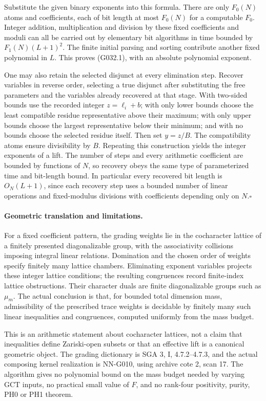 Substitute the given binary exponents into this formula.
There are only $F_0(N)$ atoms and coefficients, each of
bit length at most $F_0(N)$ for a computable $F_0$.
Integer addition, multiplication and division by these
fixed coefficients and moduli can all be carried out by
elementary bit algorithms in time bounded by
$F_1(N)(L+1)^2$. The finite initial parsing and sorting
contribute another fixed polynomial in $L$.
This proves (G032.1), with an absolute polynomial exponent.

One may also retain the selected disjunct at every elimination
step. Recover variables in reverse order, selecting a true
disjunct after substituting the free parameters and the variables
already recovered at that stage. With two-sided
bounds use the recorded integer $z=\ell_i+b$; with only
lower bounds choose the least compatible residue representative
above their maximum; with only upper bounds choose the
largest representative below their minimum; and with no
bounds choose the selected residue itself. Then set $y=z/B$.
The compatibility atoms ensure divisibility by $B$.
Repeating this construction yields the integer exponents
of a lift. The number of steps and every arithmetic
coefficient are bounded by functions of $N$, so recovery
obeys the same type of parameterized time and bit-length
bound. In particular every recovered bit length is
$O_N(L+1)$, since each recovery step uses a bounded number
of linear operations and fixed-modulus divisions with
coefficients depending only on $N$.\hfill$\square$

\paragraph{Geometric translation and limitations.}
For a fixed coefficient pattern, the grading weights lie
in the cocharacter lattice of a finitely presented
diagonalizable group, with the associativity collisions
imposing integral linear relations. Domination and the
chosen order of weights specify finitely many lattice
chambers. Eliminating exponent variables projects these
integer lattice conditions; the resulting congruences
record finite-index lattice obstructions. Their character
duals are finite diagonalizable groups such as $\mu_m$.
The actual conclusion is that, for bounded total dimension
mass, admissibility of the prescribed trace weights is
decidable by finitely many such linear inequalities and
congruences, computed uniformly from the mass budget.

This is an arithmetic statement about cocharacter lattices,
not a claim that inequalities define Zariski-open subsets
or that an effective lift is a canonical geometric object.
The grading dictionary is SGA 3, I, 4.7.2--4.7.3, and
the actual composing kernel realization is NN-G010,
using archive cote 2, scan 17. The algorithm gives no
polynomial bound on the mass budget needed by varying
GCT inputs, no practical small value of $F$, and no
rank-four positivity, purity, PH0 or PH1 theorem.




